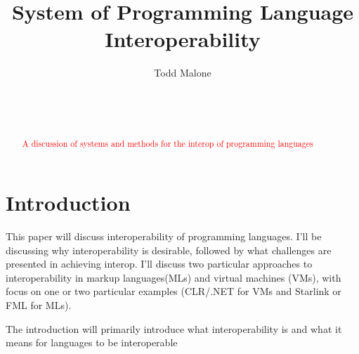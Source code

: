 \documentclass{sig-alternate}
\newcommand{\mycomment}[1]{\textcolor{red}{#1}}
\begin{document}

\title{System of Programming Language Interoperability}


\author{
\alignauthor
Todd Malone\\
	\\
	\\
	\\
}

\maketitle
\begin{abstract}
\mycomment{A discussion of systems and methods for the interop of programming languages}
\end{abstract}

\section{Introduction}
This paper will discuss interoperability of programming languages. I'll be discussing why interoperability is desirable, followed by what challenges are presented in achieving interop.
I'll discuss two particular approaches to interoperability in markup languages(MLs) and virtual machines (VMs), with focus on one or two particular examples (CLR/.NET for VMs and Starlink or FML for MLs).


The introduction will primarily introduce what interoperability is and what it means for languages to be interoperable \cite{Ide:2010}
\end{document}
